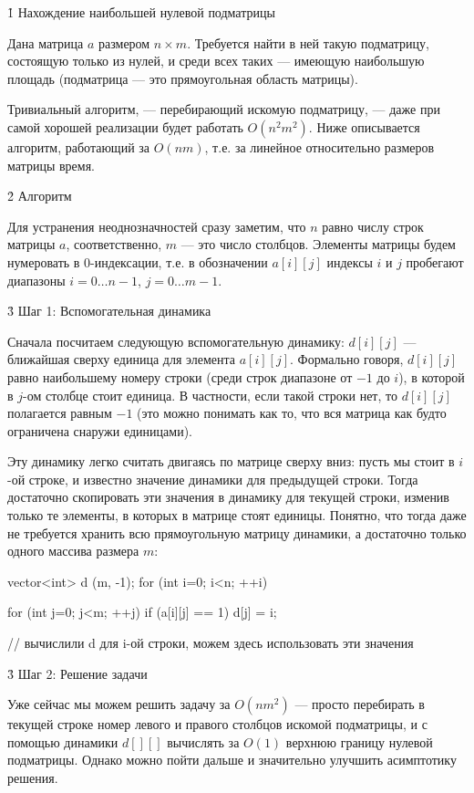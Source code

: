 \h1{ Нахождение наибольшей нулевой подматрицы }

Дана матрица $a$ размером $n \times m$. Требуется найти в ней такую подматрицу, состоящую только из нулей, и среди всех таких --- имеющую наибольшую площадь (подматрица --- это прямоугольная область матрицы).

Тривиальный алгоритм, --- перебирающий искомую подматрицу, --- даже при самой хорошей реализации будет работать $O (n^2 m^2)$. Ниже описывается алгоритм, работающий за $O (n m)$, т.е. за линейное относительно размеров матрицы время.


\h2{ Алгоритм }

Для устранения неоднозначностей сразу заметим, что $n$ равно числу строк матрицы $a$, соответственно, $m$ --- это число столбцов. Элементы матрицы будем нумеровать в $0$-индексации, т.е. в обозначении $a[i][j]$ индексы $i$ и $j$ пробегают диапазоны $i = 0 \ldots n-1$, $j = 0 \ldots m-1$.


\h3{ Шаг 1: Вспомогательная динамика }

Сначала посчитаем следующую вспомогательную динамику: $d[i][j]$ --- ближайшая сверху единица для элемента $a[i][j]$. Формально говоря, $d[i][j]$ равно наибольшему номеру строки (среди строк диапазоне от $-1$ до $i$), в которой в $j$-ом столбце стоит единица. В частности, если такой строки нет, то $d[i][j]$ полагается равным $-1$ (это можно понимать как то, что вся матрица как будто ограничена снаружи единицами).

Эту динамику легко считать двигаясь по матрице сверху вниз: пусть мы стоит в $i$-ой строке, и известно значение динамики для предыдущей строки. Тогда достаточно скопировать эти значения в динамику для текущей строки, изменив только те элементы, в которых в матрице стоят единицы. Понятно, что тогда даже не требуется хранить всю прямоугольную матрицу динамики, а достаточно только одного массива размера $m$:

\code
vector<int> d (m, -1);
for (int i=0; i<n; ++i) {
	for (int j=0; j<m; ++j)
		if (a[i][j] == 1)
			d[j] = i;

	// вычислили d для i-ой строки, можем здесь использовать эти значения
}
\endcode


\h3{ Шаг 2: Решение задачи }

Уже сейчас мы можем решить задачу за $O (n m^2)$ --- просто перебирать в текущей строке номер левого и правого столбцов искомой подматрицы, и с помощью динамики $d[][]$ вычислять за $O (1)$ верхнюю границу нулевой подматрицы. Однако можно пойти дальше и значительно улучшить асимптотику решения.

